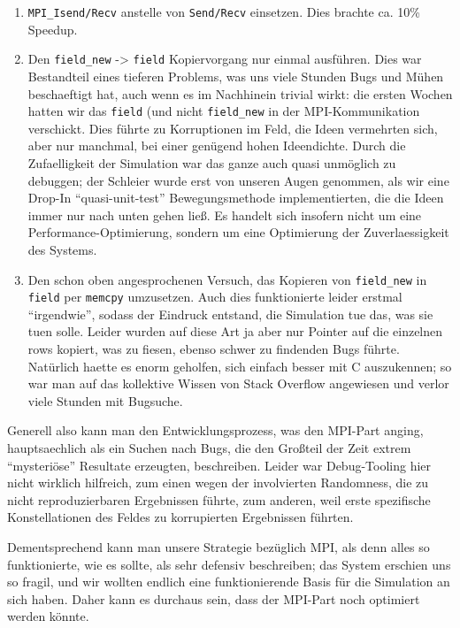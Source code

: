 \begin{enumerate}
\def\labelenumi{\arabic{enumi}.}
\itemsep1pt\parskip0pt
\item
  \texttt{MPI\_Isend/Recv} anstelle von \texttt{Send/Recv} einsetzen.
  Dies brachte ca. 10\% Speedup.
\item
  Den \texttt{field\_new} -\textgreater{} \texttt{field} Kopiervorgang
  nur einmal ausführen. Dies war Bestandteil eines tieferen Problems,
  was uns viele Stunden Bugs und Mühen beschaeftigt hat, auch wenn es im
  Nachhinein trivial wirkt: die ersten Wochen hatten wir das
  \texttt{field} (und nicht \texttt{field\_new} in der MPI-Kommunikation
  verschickt. Dies führte zu Korruptionen im Feld, die Ideen vermehrten
  sich, aber nur manchmal, bei einer genügend hohen Ideendichte. Durch
  die Zufaelligkeit der Simulation war das ganze auch quasi unmöglich zu
  debuggen; der Schleier wurde erst von unseren Augen genommen, als wir
  eine Drop-In ``quasi-unit-test'' Bewegungsmethode implementierten, die
  die Ideen immer nur nach unten gehen ließ. Es handelt sich insofern
  nicht um eine Performance-Optimierung, sondern um eine Optimierung der
  Zuverlaessigkeit des Systems.
\item
  Den schon oben angesprochenen Versuch, das Kopieren von
  \texttt{field\_new} in \texttt{field} per \texttt{memcpy} umzusetzen.
  Auch dies funktionierte leider erstmal ``irgendwie'', sodass der
  Eindruck entstand, die Simulation tue das, was sie tuen solle. Leider
  wurden auf diese Art ja aber nur Pointer auf die einzelnen rows
  kopiert, was zu fiesen, ebenso schwer zu findenden Bugs führte.
  Natürlich haette es enorm geholfen, sich einfach besser mit C
  auszukennen; so war man auf das kollektive Wissen von Stack Overflow
  angewiesen und verlor viele Stunden mit Bugsuche.
\end{enumerate}

Generell also kann man den Entwicklungsprozess, was den MPI-Part anging,
hauptsaechlich als ein Suchen nach Bugs, die den Großteil der Zeit
extrem ``mysteriöse'' Resultate erzeugten, beschreiben. Leider war
Debug-Tooling hier nicht wirklich hilfreich, zum einen wegen der
involvierten Randomness, die zu nicht reproduzierbaren Ergebnissen
führte, zum anderen, weil erste spezifische Konstellationen des Feldes
zu korrupierten Ergebnissen führten.

Dementsprechend kann man unsere Strategie bezüglich MPI, als denn alles
so funktionierte, wie es sollte, als sehr defensiv beschreiben; das
System erschien uns so fragil, und wir wollten endlich eine
funktionierende Basis für die Simulation an sich haben. Daher kann es
durchaus sein, dass der MPI-Part noch optimiert werden könnte.

